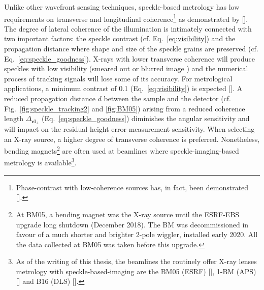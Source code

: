 \begin{refsection}
Unlike other wavefront sensing techniques, speckle-based metrology has low requirements on transverse and longitudinal coherence\footnote{Phase-contrast with low-coherence sources has, in fact, been demonstrated [\cite{Cloetens1996, Wilkins1996, Pfeiffer2006, Munro2012}].} as demonstrated by [\cite{Zanette2014,Zdora2015,Wang2016}]. The degree of lateral coherence of the illumination is intimately connected with two important factors: the speckle contrast (cf. Eq.~\ref{eq:visibility}) and the propagation distance where shape and size of the speckle grains are preserved (cf. Eq.~\ref{eq:speckle_goodness}). X-rays with lower transverse coherence will produce speckles with low visibility (smeared out or blurred image ) and the numerical process of tracking signals will lose some of its accuracy. For metrological applications, a minimum contrast of 0.1 (Eq.~\ref{eq:visibility}) is expected [\cite{Berujon2020a}]. A reduced propagation distance $d$ between the sample and the detector (cf. Fig.~\ref{fig:speckle_tracking2} and \ref{fig:BM05}) arising from a reduced coherence length $\Delta_{\textbf{cl}_\perp}$ (Eq.~\ref{eq:speckle_goodness}) diminishes the angular sensitivity and will impact on the residual height error measurement sensitivity. When selecting an X-ray source, a higher degree of transverse coherence is preferred. Nonetheless, bending magnets\footnote{At BM05, a bending magnet was the X-ray source until the ESRF-EBS upgrade long shutdown (December 2018). The BM was decommissioned in favour of a much shorter and brighter 2-pole wiggler, installed early 2020. All the data collected at BM05 was taken before this upgrade.} are often used at beamlines where speckle-imaging-based metrology is available\footnote{As of the writing of this thesis, the beamlines the routinely offer X-ray lenses metrology with speckle-based-imaging are the BM05 (ESRF) [\cite{Berujon2020a}], 1-BM (APS) [\cite{Qiao2020}] and B16 (DLS) [\cite{Sawhney2013}].}. 


\end{refsection}
